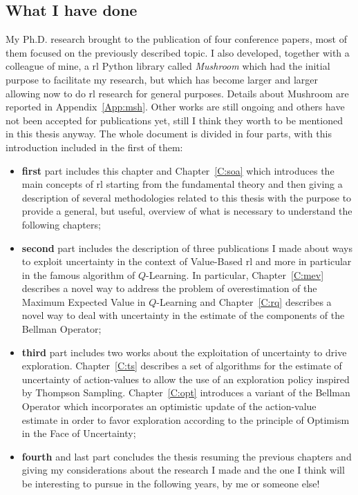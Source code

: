 \subsection{What I have done}
My Ph.D. research brought to the publication of four conference papers, most of them focused on the previously described topic. I also developed, together with a colleague of mine, a \gls{rl} Python library called \textit{Mushroom} which had the initial purpose to facilitate my research, but which has become larger and larger allowing now to do \gls{rl} research for general purposes. Details about Mushroom are reported in Appendix~\ref{App:msh}. Other works are still ongoing and others have not been accepted for publications yet, still I think they worth to be mentioned in this thesis anyway. The whole document is divided in four parts, with this introduction included in the first of them:
\begin{itemize}
 \item \textbf{first} part includes this chapter and Chapter~\ref{C:soa} which introduces the main concepts of \gls{rl} starting from the fundamental theory and then giving a description of several methodologies related to this thesis with the purpose to provide a general, but useful, overview of what is necessary to understand the following chapters;
 \item \textbf{second} part includes the description of three publications I made about ways to exploit uncertainty in the context of Value-Based \gls{rl} and more in particular in the famous algorithm of $Q$-Learning. In particular, Chapter~\ref{C:mev} describes a novel way to address the problem of overestimation of the Maximum Expected Value in $Q$-Learning and Chapter~\ref{C:rq} describes a novel way to deal with uncertainty in the estimate of the components of the Bellman Operator;
 \item \textbf{third} part includes two works about the exploitation of uncertainty to drive exploration. Chapter~\ref{C:ts} describes a set of algorithms for the estimate of uncertainty of action-values to allow the use of an exploration policy inspired by Thompson Sampling. Chapter~\ref{C:opt} introduces a variant of the Bellman Operator which incorporates an optimistic update of the action-value estimate in order to favor exploration according to the principle of Optimism in the Face of Uncertainty;
 \item \textbf{fourth} and last part concludes the thesis resuming the previous chapters and giving my considerations about the research I made and the one I think will be interesting to pursue in the following years, by me or someone else!
\end{itemize}
